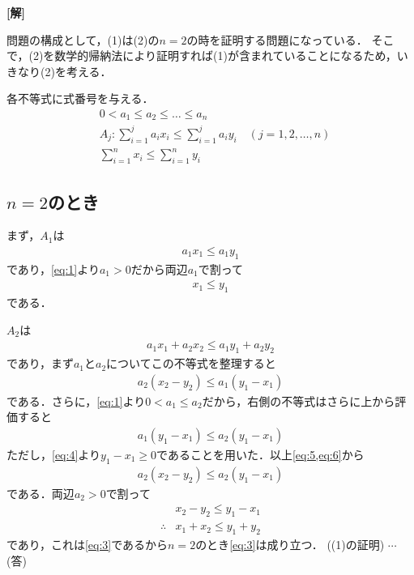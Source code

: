 \documentclass[a4paper,10pt]{ltjsarticle}
\begin{document}
\begin{multicols}{2}
  {\bf[解]}

  問題の構成として，(1)は(2)の$n=2$の時を証明する問題になっている．
  そこで，(2)を数学的帰納法により証明すれば(1)が含まれていることになるため，いきなり(2)を考える．

  各不等式に式番号を与える．
  \begin{align}
     & 0 < a_1 \le a_2 \le \dots \le a_n                                          \label{eq:1}  \\
     & A_j: \sum_{i=1}^j a_i x_i \le \sum_{i=1}^j a_i y_i \quad (j=1, 2, \dots, n) \label{eq:2} \\
     & \sum_{i=1}^n x_i \le \sum_{i=1}^n y_i \label{eq:3}
  \end{align}

  \subsection{$n=2$のとき}
  まず，$A_1$は
  \begin{align*}
    a_1x_1 \le a_1y_1
  \end{align*}
  であり，\cref{eq:1}より$a_1>0$だから両辺$a_1$で割って
  \begin{align}
    x_1 \le y_1 \label{eq:4}
  \end{align}
  である．

  $A_2$は
  \begin{align*}
    a_1x_1+a_2x_2 \le a_1y_1+a_2y_2
  \end{align*}
  であり，まず$a_1$と$a_2$についてこの不等式を整理すると
  \begin{align}
    a_2\left(x_2-y_2\right) \le a_1\left(y_1-x_1\right) \label{eq:5}
  \end{align}
  である．さらに，\cref{eq:1}より$0<a_1\le a_2$だから，右側の不等式はさらに上から評価すると
  \begin{align}
    a_1\left(y_1-x_1\right) \le a_2 \left(y_1-x_1\right) \label{eq:6}
  \end{align}
  ただし，\cref{eq:4}より$y_1-x_1\ge 0$であることを用いた．以上\cref{eq:5,eq:6}から
  \begin{align*}
    a_2\left(x_2-y_2\right) \le a_2 \left(y_1-x_1\right)
  \end{align*}
  である．両辺$a_2>0$で割って
  \begin{align*}
     & x_2-y_2 \le y_1-x_1 \\
    \therefore
     & x_1+x_2 \le y_1+y_2
  \end{align*}
  であり，これは\cref{eq:3}であるから$n=2$のとき\cref{eq:3}は成り立つ．
  ((1)の証明)  $\cdots$(答)


\end{multicols}
\end{document}
